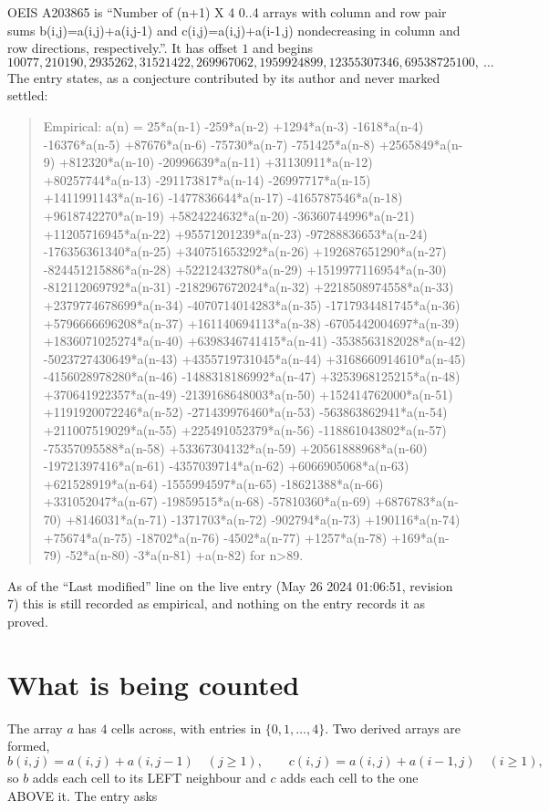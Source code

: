 \documentclass[11pt,a4paper]{article}
\theoremstyle{plain}
\theoremstyle{definition}
\begin{document}
OEIS A203865 is ``Number of (n+1) X 4 0..4 arrays with column and row pair sums b(i,j)=a(i,j)+a(i,j-1) and c(i,j)=a(i,j)+a(i-1,j) nondecreasing in column and row directions, respectively.''. It has offset $1$ and begins
\[
10077, 210190, 2935262, 31521422, 269967062, 1959924899, 12355307346, 69538725100,\ \dots
\]
The entry states, as a conjecture contributed by its author and never marked settled:
\begin{quote}
Empirical: a(n) = 25*a(n-1) -259*a(n-2) +1294*a(n-3) -1618*a(n-4) -16376*a(n-5) +87676*a(n-6) -75730*a(n-7) -751425*a(n-8) +2565849*a(n-9) +812320*a(n-10) -20996639*a(n-11) +31130911*a(n-12) +80257744*a(n-13) -291173817*a(n-14) -26997717*a(n-15) +1411991143*a(n-16) -1477836644*a(n-17) -4165787546*a(n-18) +9618742270*a(n-19) +5824224632*a(n-20) -36360744996*a(n-21) +11205716945*a(n-22) +95571201239*a(n-23) -97288836653*a(n-24) -176356361340*a(n-25) +340751653292*a(n-26) +192687651290*a(n-27) -824451215886*a(n-28) +52212432780*a(n-29) +1519977116954*a(n-30) -812112069792*a(n-31) -2182967672024*a(n-32) +2218508974558*a(n-33) +2379774678699*a(n-34) -4070714014283*a(n-35) -1717934481745*a(n-36) +5796666696208*a(n-37) +161140694113*a(n-38) -6705442004697*a(n-39) +1836071025274*a(n-40) +6398346741415*a(n-41) -3538563182028*a(n-42) -5023727430649*a(n-43) +4355719731045*a(n-44) +3168660914610*a(n-45) -4156028978280*a(n-46) -1488318186992*a(n-47) +3253968125215*a(n-48) +370641922357*a(n-49) -2139168648003*a(n-50) +152414762000*a(n-51) +1191920072246*a(n-52) -271439976460*a(n-53) -563863862941*a(n-54) +211007519029*a(n-55) +225491052379*a(n-56) -118861043802*a(n-57) -75357095588*a(n-58) +53367304132*a(n-59) +20561888968*a(n-60) -19721397416*a(n-61) -4357039714*a(n-62) +6066905068*a(n-63) +621528919*a(n-64) -1555994597*a(n-65) -18621388*a(n-66) +331052047*a(n-67) -19859515*a(n-68) -57810360*a(n-69) +6876783*a(n-70) +8146031*a(n-71) -1371703*a(n-72) -902794*a(n-73) +190116*a(n-74) +75674*a(n-75) -18702*a(n-76) -4502*a(n-77) +1257*a(n-78) +169*a(n-79) -52*a(n-80) -3*a(n-81) +a(n-82) for n>89.
\end{quote}
As of the ``Last modified'' line on the live entry (May 26 2024 01:06:51, revision 7) this is still
recorded as empirical, and nothing on the entry records it as proved.

\section{What is being counted}

The array $a$ has $4$ cells across, with entries in $\{0,1,\dots,4\}$. Two derived arrays are formed,
\[
b(i,j)=a(i,j)+a(i,j-1)\quad(j\ge1),\qquad c(i,j)=a(i,j)+a(i-1,j)\quad(i\ge1),
\]
so $b$ adds each cell to its LEFT neighbour and $c$ adds each cell to the one ABOVE it. The
entry asks
\end{document}
